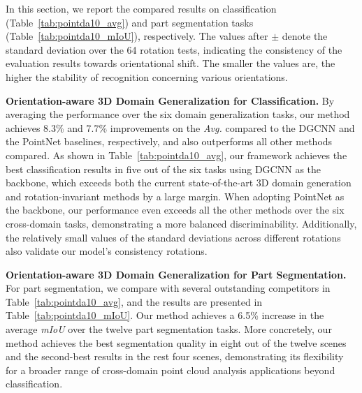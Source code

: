 In this section, we report the compared results on classification (Table~\ref{tab:pointda10_avg}) and part segmentation tasks (Table~\ref{tab:pointda10_mIoU}), respectively. The values after $\pm$ denote the standard deviation over the 64 rotation tests, indicating the consistency of the evaluation results towards orientational shift. The smaller the values are, the higher the stability of recognition concerning various orientations.

\noindent\textbf{Orientation-aware 3D Domain Generalization for Classification.}
By averaging the performance over the six domain generalization tasks, our method achieves 8.3\% and 7.7\% improvements on the \textit{Avg.} compared to the DGCNN and the PointNet baselines, respectively, and also outperforms all other methods compared.
As shown in Table~\ref{tab:pointda10_avg}, our framework achieves the best classification results in five out of the six tasks using DGCNN as the backbone, which exceeds both the current state-of-the-art 3D domain generation and rotation-invariant methods by a large margin. When adopting PointNet as the backbone, our performance even exceeds all the other methods over the six cross-domain tasks, demonstrating a more balanced discriminability. Additionally, the relatively small values of the standard deviations across different rotations also validate our model's consistency \wrt rotations.



\noindent\textbf{Orientation-aware 3D Domain Generalization for Part Segmentation.}
For part segmentation, we compare with several outstanding competitors in Table~\ref{tab:pointda10_avg}, and the results are presented in Table~\ref{tab:pointda10_mIoU}. Our method achieves a 6.5\% increase in the average \textit{mIoU} over the twelve part segmentation tasks. More concretely, our method achieves the best segmentation quality in eight out of the twelve scenes and the second-best results in the rest four scenes, demonstrating its flexibility for a broader range of cross-domain point cloud analysis applications beyond classification.

